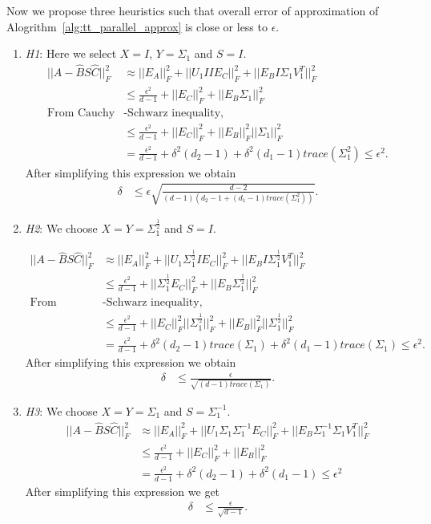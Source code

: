 \documentclass[runningheads]{llncs}
\begin{document}
\noindent Now we propose three heuristics such that overall error of approximation of Alogrithm~\ref{alg:tt_parallel_approx} is close or less to $\epsilon$.
\begin{enumerate}
	\item \textit{H1}: Here we select $X = I$, $Y = \Sigma_1$ and $S = I$.	
	\begin{align*}
	||A - \hat{B} S \hat{C}||_F^2 &\approx ||E_A||_F^2 + ||U_1IIE_C||_F^2 + ||E_BI\Sigma_1V_1^T||_F^2 \\
	&\le \frac{\epsilon^2}{d-1}  + ||E_C||_F^2 + ||E_B\Sigma_1||_F^2 \\
	\text{From Cauchy} & \text{-Schwarz inequality,}\\
	&\le \frac{\epsilon^2}{d-1}  + ||E_C||_F^2 + ||E_B||_F^2  ||\Sigma_1||_F^2  \\
	&= \frac{\epsilon^2}{d-1} + \delta^2 (d_2-1)+ \delta^2  (d_1-1) trace(\Sigma_1^2)\le \epsilon^2.
	\end{align*}
	\noindent After simplifying this expression we obtain
	\begin{align*}
	\delta &\le \epsilon \sqrt{\frac{d-2}{(d-1) (d_2 -1 + (d_1-1) trace(\Sigma_1^2))}}.
	\end{align*}
	
	\item \textit{H2}: We choose $X=Y=\Sigma_1^{\frac{1}{2}}$ and $S=I$.
	
	\begin{align*}
	||A - \hat{B} S \hat{C}||_F^2 &\approx ||E_A||_F^2 + ||U_1 \Sigma_1^{\frac{1}{2}} IE_C||_F^2 + ||E_B I \Sigma_1^{\frac{1}{2}} V_1^T||_F^2 \\
	&\le \frac{\epsilon^2}{d-1}  + ||\Sigma_1^{\frac{1}{2}} E_C||_F^2 + ||E_B \Sigma_1^{\frac{1}{2}}||_F^2 \\
	\text{From Cauchy} & \text{-Schwarz inequality,}\\
	&\le \frac{\epsilon^2}{d-1}  + ||E_C||_F^2 ||\Sigma_1^{\frac{1}{2}}||_F^2 + ||E_B||_F^2  ||\Sigma_1^{\frac{1}{2}}||_F^2  \\
	&= \frac{\epsilon^2}{d-1} + \delta^2 (d_2-1) trace(\Sigma_1) + \delta^2 (d_1 -1) trace(\Sigma_1)\le \epsilon^2.
	\end{align*} 
	\noindent After simplifying this expression we obtain
	\begin{align*}
	\delta &\le \frac{\epsilon}{\sqrt{(d-1)trace(\Sigma_1)}}.
	\end{align*}
	
	\item \textit{H3}: We choose $X=Y=\Sigma_1$ and $S=\Sigma_1^{-1}$.
	\begin{align*}
	||A - \hat{B} S \hat{C}||_F^2 &\approx ||E_A||_F^2 + ||U_1\Sigma_1 \Sigma_1^{-1} E_C||_F^2 + ||E_B \Sigma_1^{-1} \Sigma_1 V_1^T||_F^2\\
	&\le  \frac{\epsilon^2}{d-1} + ||E_C||_F^2 +  ||E_B||_F^2 \\
	&= \frac{\epsilon^2}{d-1} + \delta^2 (d_2 -1) + \delta^2 (d_1-1) \le \epsilon^2
	\end{align*}
	\noindent After simplifying this expression we get
	\begin{align*}
	\delta &\le \frac{\epsilon}{\sqrt{d-1}}.
	\end{align*}	
\end{enumerate}
\end{document}
